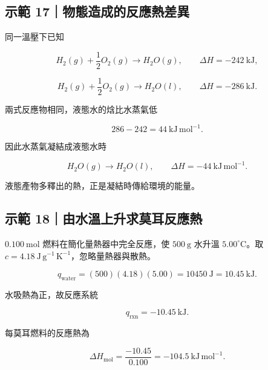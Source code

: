 \documentclass[11pt,a4paper]{article}
\begin{document}
\begin{HandoutWorkedExample}

\subsection{示範 17｜物態造成的反應熱差異}\label{ux793aux7bc4-17ux7269ux614bux9020ux6210ux7684ux53cdux61c9ux71b1ux5deeux7570}

同一溫壓下已知

\[
H_2(g)+\frac12O_2(g)\rightarrow H_2O(g),
\qquad\Delta H=-242\ \mathrm{kJ},
\]

\[
H_2(g)+\frac12O_2(g)\rightarrow H_2O(l),
\qquad\Delta H=-286\ \mathrm{kJ}.
\]

兩式反應物相同，液態水的焓比水蒸氣低

\[
286-242=44\ \mathrm{kJ\,mol^{-1}}.
\]

因此水蒸氣凝結成液態水時

\[
H_2O(g)\rightarrow H_2O(l),
\qquad\Delta H=-44\ \mathrm{kJ\,mol^{-1}}.
\]

液態產物多釋出的熱，正是凝結時傳給環境的能量。

\end{HandoutWorkedExample}

\begin{HandoutWorkedExample}

\subsection{示範 18｜由水溫上升求莫耳反應熱}\label{ux793aux7bc4-18ux7531ux6c34ux6eabux4e0aux5347ux6c42ux83abux8033ux53cdux61c9ux71b1}

\(0.100\ \mathrm{mol}\) 燃料在簡化量熱器中完全反應，使 \(500\ \mathrm g\) 水升溫 \(5.00^\circ\mathrm C\)。取 \(c=4.18\ \mathrm{J\,g^{-1}\,K^{-1}}\)，忽略量熱器與散熱。

\[
q_{\mathrm{water}}=(500)(4.18)(5.00)=10450\ \mathrm J=10.45\ \mathrm{kJ}.
\]

水吸熱為正，故反應系統

\[
q_{\mathrm{rxn}}=-10.45\ \mathrm{kJ}.
\]

每莫耳燃料的反應熱為

\[
\Delta H_{\mathrm{mol}}=\frac{-10.45}{0.100}
=-104.5\ \mathrm{kJ\,mol^{-1}}.
\]

\end{HandoutWorkedExample}
\end{document}
